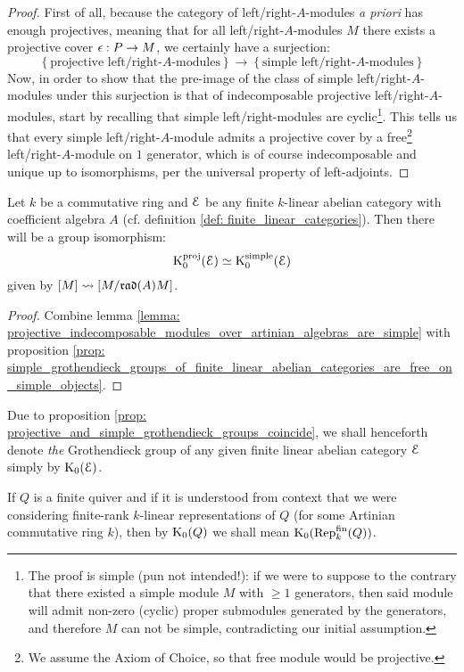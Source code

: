                 \begin{proof}
                    First of all, because the category of left/right-$A$-modules \textit{a priori} has enough projectives, meaning that for all left/right-$A$-modules $M$ there exists a projective cover $\epsilon: P \to M$, we certainly have a surjection:
                        $$
                            \left\{\text{projective left/right-$A$-modules}\right\}
                            \to
                            \left\{\text{simple left/right-$A$-modules}\right\}
                        $$
                    Now, in order to show that the pre-image of the class of simple left/right-$A$-modules under this surjection is that of indecomposable projective left/right-$A$-modules, start by recalling that simple left/right-modules are cyclic\footnote{The proof is simple (pun not intended!): if we were to suppose to the contrary that there existed a simple module $M$ with $\geq 1$ generators, then said module will admit non-zero (cyclic) proper submodules generated by the generators, and therefore $M$ can not be simple, contradicting our initial assumption.}. This tells us that every simple left/right-$A$-module admits a projective cover by a free\footnote{We assume the Axiom of Choice, so that free module would be projective.} left/right-$A$-module on $1$ generator, which is of course indecomposable and unique up to isomorphisms, per the universal property of left-adjoints.
                \end{proof}
            \begin{proposition} \label{prop: projective_and_simple_grothendieck_groups_coincide}
                Let $k$ be a commutative ring and $\mathcal{E}$ be any finite $k$-linear abelian category with coefficient algebra $A$ (cf. definition \ref{def: finite_linear_categories}). Then there will be a group isomorphism:
                    $$\mathrm{K}_0^{\mathrm{proj}}(\mathcal{E}) \simeq \mathrm{K}_0^{\mathrm{simple}}(\mathcal{E})$$
                given by $[M] \leadsto [M/\mathfrak{rad}(A) M]$.
            \end{proposition}
                \begin{proof}
                    Combine lemma \ref{lemma: projective_indecomposable_modules_over_artinian_algebras_are_simple} with proposition \ref{prop: simple_grothendieck_groups_of_finite_linear_abelian_categories_are_free_on_simple_objects}.
                \end{proof}
            \begin{convention}
                Due to proposition \ref{prop: projective_and_simple_grothendieck_groups_coincide}, we shall henceforth denote \textit{the} Grothendieck group of any given finite linear abelian category $\mathcal{E}$ simply by $\mathrm{K}_0(\mathcal{E})$.
            \end{convention}
            \begin{convention}
                If $Q$ is a finite quiver and if it is understood from context that we were considering finite-rank $k$-linear representations of $Q$ (for some Artinian commutative ring $k$), then by $\mathrm{K}_0(Q)$ we shall mean $\mathrm{K}_0(\mathrm{Rep}_k^{\mathrm{fin}}(Q))$.
            \end{convention}
            
